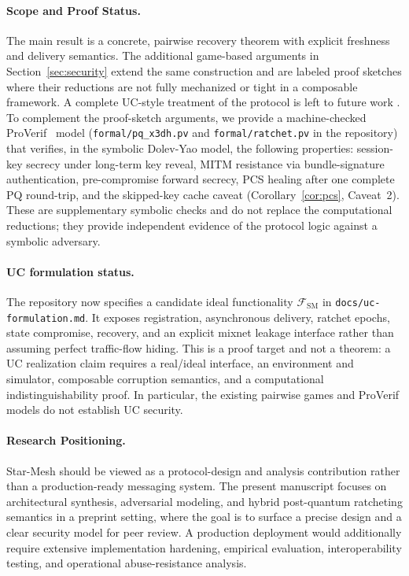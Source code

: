 \documentclass[11pt,a4paper]{article}
\theoremstyle{remark}
\theoremstyle{plain}
\begin{document}
\paragraph{Scope and Proof Status.}
The main result is a concrete, pairwise recovery theorem with explicit freshness and delivery
semantics.  The additional game-based arguments in Section~\ref{sec:security} extend the same
construction and are labeled proof sketches where their reductions are not fully mechanized or
tight in a composable framework.  A complete UC-style treatment of the protocol is left to future work \cite{uc_framework}.  To complement the proof-sketch arguments, we provide a machine-checked
ProVerif~\cite{proverif} model
(\texttt{formal/pq\_x3dh.pv} and \texttt{formal/ratchet.pv} in the repository) that verifies,
in the symbolic Dolev-Yao model, the following properties: session-key secrecy under long-term
key reveal, MITM resistance via bundle-signature authentication, pre-compromise forward secrecy,
PCS healing after one complete PQ round-trip, and the skipped-key cache caveat
(Corollary~\ref{cor:pcs}, Caveat~2).  These are supplementary symbolic checks and do
not replace the computational reductions; they provide independent evidence of the protocol
logic against a symbolic adversary.

\paragraph{UC formulation status.}
The repository now specifies a candidate ideal functionality $\mathcal{F}_{\mathrm{SM}}$ in
\texttt{docs/uc-formulation.md}.  It exposes registration, asynchronous delivery, ratchet epochs,
state compromise, recovery, and an explicit mixnet leakage interface rather than assuming perfect
traffic-flow hiding.  This is a proof target and not a theorem: a UC realization claim requires a
real/ideal interface, an environment and simulator, composable corruption semantics, and a
computational indistinguishability proof.  In particular, the existing pairwise games and
ProVerif models do not establish UC security.

\paragraph{Research Positioning.}
Star-Mesh should be viewed as a protocol-design and analysis contribution rather than a
production-ready messaging system.  The present manuscript focuses on architectural synthesis,
adversarial modeling, and hybrid post-quantum ratcheting semantics in a preprint setting,
where the goal is to surface a precise design and a clear security model for peer review.
A production deployment would additionally require extensive implementation hardening,
empirical evaluation, interoperability testing, and operational abuse-resistance analysis.
\end{document}
